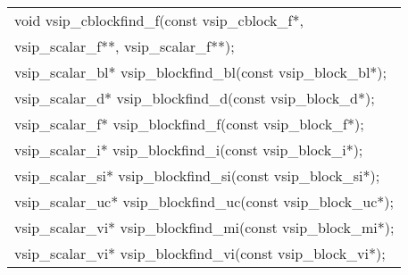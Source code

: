 {\begin{tabular}[H]{l}
void vsip\_cblockfind\_f(const vsip\_cblock\_f*,\\*\hspace{.7cm}vsip\_scalar\_f**, vsip\_scalar\_f**);\\
vsip\_scalar\_bl* vsip\_blockfind\_bl(const vsip\_block\_bl*);\\
vsip\_scalar\_d* vsip\_blockfind\_d(const vsip\_block\_d*);\\
vsip\_scalar\_f* vsip\_blockfind\_f(const vsip\_block\_f*);\\
vsip\_scalar\_i* vsip\_blockfind\_i(const vsip\_block\_i*);\\
vsip\_scalar\_si* vsip\_blockfind\_si(const vsip\_block\_si*);\\
vsip\_scalar\_uc* vsip\_blockfind\_uc(const vsip\_block\_uc*);\\
vsip\_scalar\_vi* vsip\_blockfind\_mi(const vsip\_block\_mi*);\\
vsip\_scalar\_vi* vsip\_blockfind\_vi(const vsip\_block\_vi*);\\
\end{tabular}
}
